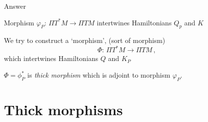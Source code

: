 \documentclass{beamer}
\begin{document}
\begin{frame} {Answer}
 
         Morphism $\varphi_P\colon\, \Pi T^*M \to \Pi TM$
   intertwines Hamiltonians $Q_p$ and $K$      

           We try to construct a `morphism', (sort of morphism)
                             $$
        \Phi\colon\, \Pi T^*M \to \Pi TM\,,
                       $$
   which intertwines Hamiltonians $Q$ and $K_P$\\
 
\medskip

  $\Phi=\phi_P^*$ is {\it thick morphism} which is 
adjoint to morphism $\varphi_P$.      
\end{frame}

\section {Thick morphisms}
\end{document}
